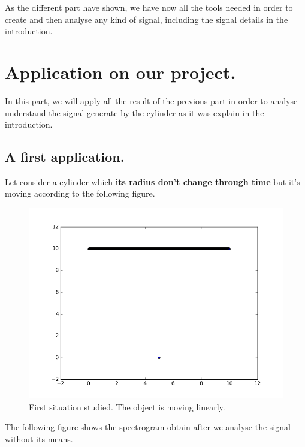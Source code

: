 As the different part have shown, we have now all the tools needed in order to create and then analyse any kind of signal, including the signal details in the introduction.

\chapter{Application on our project.}

In this part, we will apply all the result of the previous part in order to analyse understand the signal generate by the cylinder as it was explain in the introduction.

\section{A first application.}

Let consider a cylinder which \textbf{its radius don't change through time} but it's moving according to the following figure.

\begin{figure}[H]
\centering
    \includegraphics[scale=0.6,angle=0]{Images/Position.png}
    \caption{First situation studied. The object is moving linearly.}
    \label{fig:moving linearly}
\end{figure}

The following figure shows the spectrogram obtain after we analyse the signal without its means.

